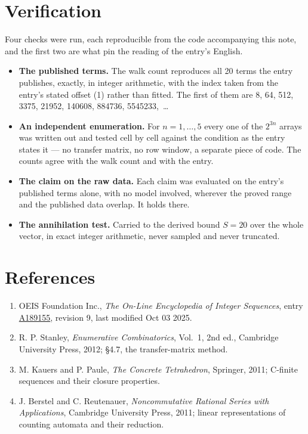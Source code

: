 \documentclass[11pt]{article}
\theoremstyle{definition}
\begin{document}
\section{Verification}

Four checks were run, each reproducible from the code accompanying this note, and the first two are what pin the reading of the entry's English.

\begin{itemize}

\item {\bfseries The published terms.} The walk count reproduces all 20 terms the entry publishes, exactly, in integer arithmetic, with the index taken from the entry's stated offset (1) rather than fitted. The first of them are 8, 64, 512, 3375, 21952, 140608, 884736, 5545233,~\dots

\item {\bfseries An independent enumeration.} For $n = 1,\dots,5$ every one of the $2^{3n}$ arrays was written out and tested cell by cell against the condition as the entry states it --- no transfer matrix, no row window, a separate piece of code. The counts agree with the walk count and with the entry.

\item {\bfseries The claim on the raw data.} Each claim was evaluated on the entry's published terms alone, with no model involved, wherever the proved range and the published data overlap. It holds there.

\item {\bfseries The annihilation test.} Carried to the derived bound $S = 20$ over the whole vector, in exact integer arithmetic, never sampled and never truncated.

\end{itemize}

\section{References}

\begin{enumerate}

\item OEIS Foundation Inc., \emph{The On-Line Encyclopedia of Integer Sequences}, entry \href{https://oeis.org/A189155}{A189155}, revision 9, last modified Oct 03 2025.

\item R. P. Stanley, \emph{Enumerative Combinatorics}, Vol.~1, 2nd ed., Cambridge University Press, 2012; \S4.7, the transfer-matrix method.

\item M. Kauers and P. Paule, \emph{The Concrete Tetrahedron}, Springer, 2011; C-finite sequences and their closure properties.

\item J. Berstel and C. Reutenauer, \emph{Noncommutative Rational Series with Applications}, Cambridge University Press, 2011; linear representations of counting automata and their reduction.

\end{enumerate}
\end{document}
